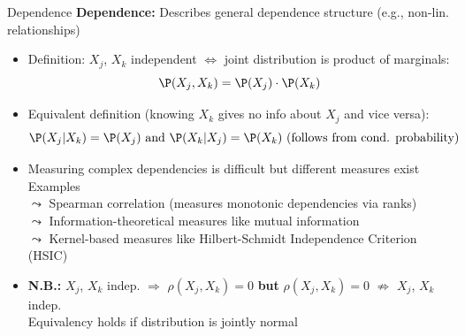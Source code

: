 \documentclass[10pt,compress,t,notes=noshow, xcolor=table]{beamer}
\begin{document}
\begin{frame}[t]{Dependence}
\textbf{Dependence:} Describes general dependence structure  (e.g., non-lin. relationships)
\begin{itemize}[<+->]
\item Definition: $X_j$, $X_k$ independent $\Leftrightarrow$ joint distribution is product of marginals:
$$\P(X_j, X_k) = \P(X_j) \cdot \P(X_k)$$
\item Equivalent definition (knowing $X_k$ gives no info about $X_j$ and vice versa):
$$\P(X_j|X_k) = \P(X_j) \text{ and } \P(X_k|X_j) = \P(X_k) \text{ (follows from cond. probability)}$$
\item Measuring complex dependencies is difficult but different measures exist\\ Examples \\
$\leadsto$ Spearman correlation (measures monotonic dependencies via ranks) \\
$\leadsto$ Information-theoretical measures like mutual information \\
$\leadsto$ Kernel-based measures like Hilbert-Schmidt Independence Criterion (HSIC) %
\item \textbf{N.B.:} $X_j$, $X_k$ indep. $\Rightarrow$ $\rho(X_j, X_k) = 0$ \textbf{but} $\rho(X_j, X_k) = 0$ $\nRightarrow$ $X_j$, $X_k$  indep. \\
Equivalency holds if distribution is jointly normal
\end{itemize}
\end{frame}
\end{document}
